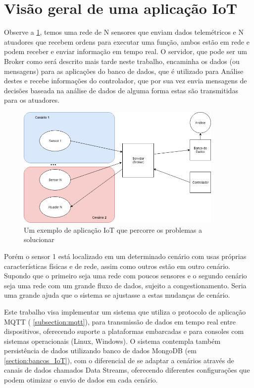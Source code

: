 \section{Visão geral de uma aplicação IoT}
\label{section:overview}

Observe  a \ref{fig:1.1.0/iot_app}, temos uma rede de N sensores que enviam dados telemétricos e N atuadores que recebem ordens para executar uma função, ambos estão em rede e podem receber e enviar informação em tempo real. O servidor, que pode ser um Broker como será descrito mais tarde neste trabalho, encaminha os dados (ou mensagens) para as aplicações do banco de dados, que é utilizado para Análise destes e recebe informações do controlador, que por sua vez envia mensagens de decisões baseada na análise de dados de alguma forma estas são transmitidas para os atuadores.

\begin{figure}[h!]
\centering
\includegraphics[width=10cm]{./02_Capitulos/02_Cap1/figures/iot_app}
\caption{Um exemplo de aplicação IoT que percorre os problemas a solucionar}
\label{fig:1.1.0/iot_app}
\end{figure}

Porém o sensor 1 está localizado em um determinado cenário com usas próprias características físicas e de rede, assim como outros estão em outro cenário. Supondo que o primeiro seja uma rede com poucos sensores e o segundo cenário seja uma rede com um grande fluxo de dados, sujeito a congestionamento. Seria uma grande ajuda que o  sistema se ajustasse a estas mudanças de cenário.

Este trabalho visa implementar um sistema que utiliza o protocolo de aplicação MQTT  ( \ref{subsection:mqtt}), para transmissão de dados em tempo real entre dispositivos, oferecendo suporte a plataformas embarcadas e para consoles com sistemas operacionais (Linux, Windows). O sistema contempla também persistência de dados utilizando banco de dados MongoDB (em  \ref{section:bancos_IoT}), com o diferencial de se adaptar a cenários através de canais de dados chamados Data Streams, oferecendo diferentes configurações que podem otimizar o envio de dados em cada cenário.

